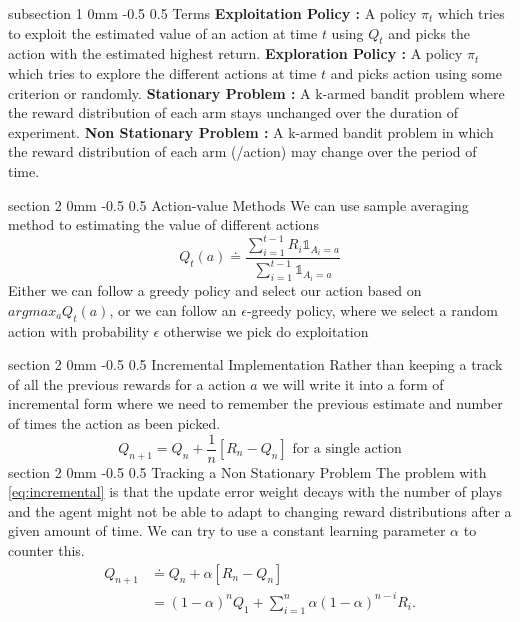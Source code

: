 \documentclass[twocolumn,11pt]{article}
\makeatletter
\renewcommand{\section}{\@startsection
{section}%
{2}%
{0mm}%
{-0.5\baselineskip}%
{0.5\baselineskip}%
{\bfseries\color{blue}}} %
\renewcommand{\subsection}{\@startsection
{subsection}%
{1}%
{0mm}%
{-0.5\baselineskip}%
{0.5\baselineskip}%
{\bfseries\color{blue}}} %
\makeatother
\begin{document}
\subsection{Terms}
\textbf{Exploitation Policy :} A policy $\pi_t$ which tries to exploit the estimated value of an action at time $t$ using $Q_t$ and picks the action with the estimated highest return.\newline
\textbf{Exploration Policy :} A policy $\pi_t$ which tries to explore the  different actions at time $t$ and picks action using some criterion or randomly.\newline
\textbf{Stationary Problem : } A k-armed bandit problem where the reward distribution of each arm stays unchanged over the duration of experiment.\newline
\textbf{Non Stationary Problem :} A k-armed bandit problem in which the reward distribution of each arm (/action) may change over the period of time.

\section{Action-value Methods}
We can use sample averaging method to estimating the value of different actions
\useshortskip\begin{equation}
    Q_t(a) \doteq  \dfrac{\sum_{i=1}^{t-1}R_i\mathbb{1}_{A_i = a}}{\sum_{i=1}^{t-1}\mathbb{1}_{A_i = a}}
\end{equation}
Either we can follow a greedy policy and select our action based on $argmax_a Q_t(a)$, or we can follow an $\epsilon$-greedy policy, where we select a random action with probability $\epsilon$ otherwise we pick do exploitation

\section{Incremental Implementation}
Rather than keeping a track of all the previous rewards for a action $a$ we will write it into a form of incremental form where we need to remember the previous estimate and number of times the action as been picked.\useshortskip
\begin{equation}\label{eq:incremental}
    Q_{n+1} = Q_n + \dfrac{1}{n}[R_n - Q_n] \text{ for a single action}
\end{equation}
\section{Tracking a Non Stationary Problem}
The problem with \ref{eq:incremental} is that the update error weight decays with the number of plays and the agent might not be able to adapt to changing reward distributions after a given amount of time. We can try to use a constant learning parameter $\alpha$ to counter this.
\begin{equation}
    \begin{split}
        Q_{n+1} &\doteq Q_n + \alpha[R_n - Q_n]\\
        &= (1 - \alpha)^n Q_1 + \sum_{i=1}^{n}\alpha(1 -\alpha)^{n-i}R_i.
    \end{split}
\end{equation}
\end{document}
